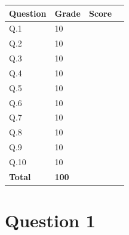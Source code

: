 \documentclass[10pt,a4paper]{article}
\begin{document}
\begin{center}
\begin{tabular}{|M{2cm}|M{2cm}|M{2cm}|N}
 	\hline
    \textbf{Question} & \textbf{Grade} & \textbf{Score} &\\[10pt] \hline
    Q.1 & 10 &  &\\ [7pt] \hline
 	Q.2 & 10 &  &\\ [7pt] \hline
 	Q.3 & 10 &  &\\ [7pt] \hline
 	Q.4 & 10 &  &\\ [7pt] \hline
 	Q.5 & 10 &  &\\ [7pt] \hline
 	Q.6 & 10 &  &\\ [7pt] \hline
 	Q.7 & 10 &  &\\ [7pt] \hline
 	Q.8 & 10 &  &\\ [7pt] \hline
    Q.9 & 10 &  &\\ [7pt] \hline
 	Q.10 & 10 &  &\\ [7pt] \hline
    \textbf{Total} & \textbf{100} &  &\\[10pt] \hline
    
\end{tabular}

\end{center}
\newpage
\section*{Question 1}

  
\end{document}
